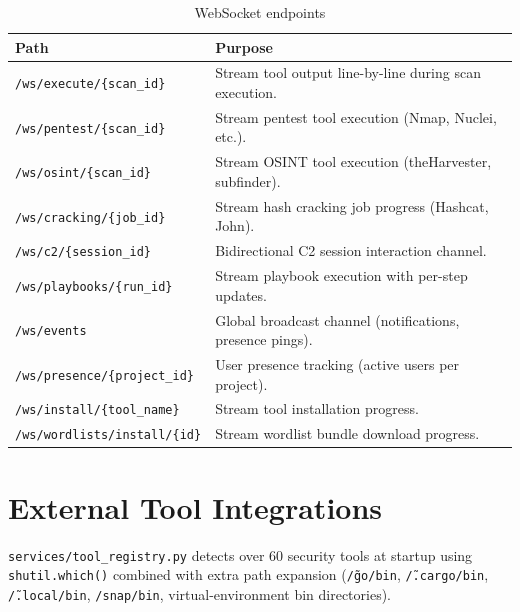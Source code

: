 \documentclass[11pt,a4paper,twoside,openright]{book}
\begin{document}
\begin{table}[H]
\centering
\begin{tabularx}{\textwidth}{L{5.5cm} X}
\toprule
\textbf{Path} & \textbf{Purpose} \\
\midrule
\texttt{/ws/execute/\{scan\_id\}}      & Stream tool output line-by-line during scan execution. \\
\texttt{/ws/pentest/\{scan\_id\}}      & Stream pentest tool execution (Nmap, Nuclei, etc.). \\
\texttt{/ws/osint/\{scan\_id\}}        & Stream OSINT tool execution (theHarvester, subfinder). \\
\texttt{/ws/cracking/\{job\_id\}}      & Stream hash cracking job progress (Hashcat, John). \\
\texttt{/ws/c2/\{session\_id\}}        & Bidirectional C2 session interaction channel. \\
\texttt{/ws/playbooks/\{run\_id\}}     & Stream playbook execution with per-step updates. \\
\texttt{/ws/events}                    & Global broadcast channel (notifications, presence pings). \\
\texttt{/ws/presence/\{project\_id\}}  & User presence tracking (active users per project). \\
\texttt{/ws/install/\{tool\_name\}}    & Stream tool installation progress. \\
\texttt{/ws/wordlists/install/\{id\}}  & Stream wordlist bundle download progress. \\
\bottomrule
\end{tabularx}
\caption{WebSocket endpoints}
\end{table}

\section{External Tool Integrations}

\texttt{services/tool\_registry.py} detects over 60 security tools at startup using \texttt{shutil.which()} combined with extra path expansion (\texttt{\~/go/bin}, \texttt{\~/.cargo/bin}, \texttt{\~/.local/bin}, \texttt{/snap/bin}, virtual-environment bin directories).
\end{document}
